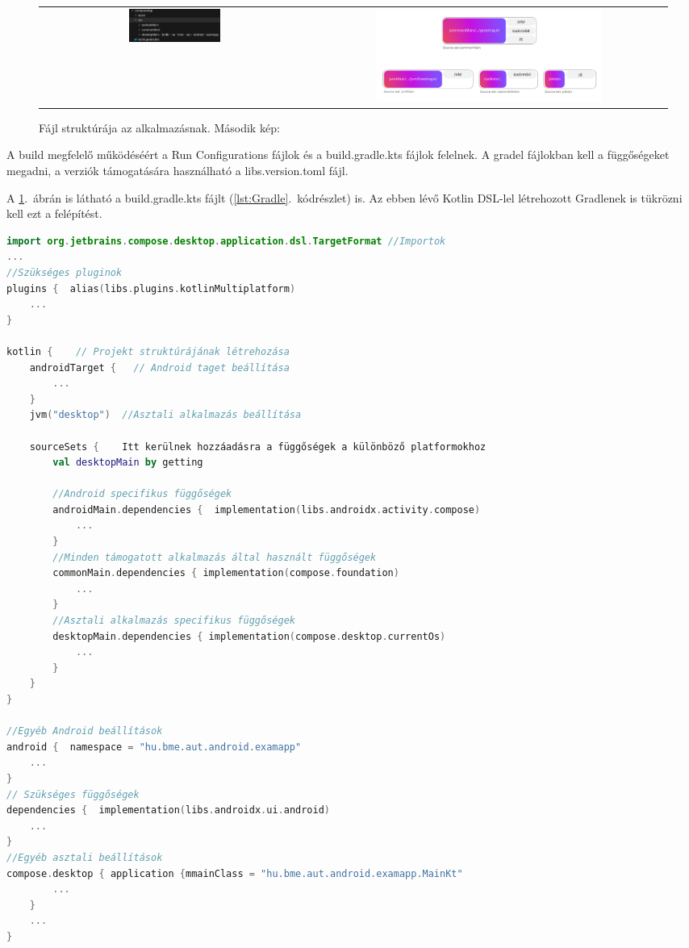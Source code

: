 \begin{figure}[!ht]
    \centering
    \begin{tabular}{cc} %
        \includegraphics[width=0.35\textwidth, keepaspectratio]{figures/KmpFileStructure.png} & 
        \includegraphics[width=0.65\textwidth, keepaspectratio]{figures/specific-target-diagram.png}
    \end{tabular}
    \caption{Fájl struktúrája az alkalmazásnak. Második kép: \cite{BasicProject}}
    \label{fig:FileStructure}
\end{figure}

A build megfelelő működéséért a Run Configurations fájlok és a build.gradle.kts fájlok felelnek.
A gradel fájlokban kell a függőségeket megadni, a verziók támogatására használható a libs.version.toml fájl.

A \ref{fig:FileStructure}.~ábrán is látható a build.gradle.kts fájlt (\ref{lst:Gradle}.~kódrészlet) is. Az ebben lévő Kotlin DSL-lel létrehozott Gradlenek is tükrözni kell ezt a felépítést.

\begin{lstlisting}[caption={build.gradle.kts fájl struktúrája}, label={lst:Gradle}, language=Kotlin]
import org.jetbrains.compose.desktop.application.dsl.TargetFormat //Importok
...
//Szükséges pluginok
plugins {  alias(libs.plugins.kotlinMultiplatform)
    ...
}

kotlin {    // Projekt struktúrájának létrehozása
    androidTarget {   // Android taget beállítása
        ...
    }
    jvm("desktop")  //Asztali alkalmazás beállítása
    
    sourceSets {    Itt kerülnek hozzáadásra a függőségek a különböző platformokhoz
        val desktopMain by getting

        //Android specifikus függőségek
        androidMain.dependencies {  implementation(libs.androidx.activity.compose)
            ...
        }
        //Minden támogatott alkalmazás által használt függőségek
        commonMain.dependencies { implementation(compose.foundation)
            ...
        }
        //Asztali alkalmazás specifikus függőségek
        desktopMain.dependencies { implementation(compose.desktop.currentOs)
            ...
        }
    }
}

//Egyéb Android beállítások
android {  namespace = "hu.bme.aut.android.examapp" 
    ... 
}
// Szükséges függőségek
dependencies {  implementation(libs.androidx.ui.android)
    ...
}
//Egyéb asztali beállítások 
compose.desktop { application {mmainClass = "hu.bme.aut.android.examapp.MainKt"
        ...
    }
    ...
}
\end{lstlisting}

